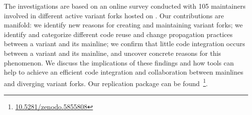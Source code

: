 The investigations are based on an online survey conducted with 105 maintainers involved in different active variant forks hosted on \gh.
%
Our contributions are manifold:
we identify new reasons for creating and maintaining variant forks;
we identify and categorize different code reuse and change propagation practices between a variant and its mainline;
we confirm that little code integration occurs between a variant and its mainline, and uncover concrete reasons for this phenomenon.
We discuss the implications of these findings and how tools can help to achieve an efficient code integration and collaboration between mainlines and diverging variant forks.
Our replication package can be found~\footnote{\url{10.5281/zenodo.5855808}}.




